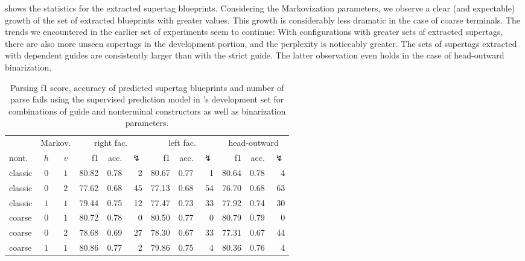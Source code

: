 \documentclass[../../document.tex]{subfiles}
\begin{document}
     shows the statistics for the extracted supertag blueprints.
    Considering the Markovization parameters, we observe a clear (and expectable) growth of the set of extracted blueprints with greater values.
    This growth is considerably less dramatic in the case of coarse terminals.
    The trends we encountered in the earlier set of experiments seem to continue:
        With configurations with greater sets of extracted supertags, there are also more unseen supertags in the development portion, and the perplexity is noticeably greater.
        The sets of supertags extracted with dependent guides are consistently larger than with the strict guide.
    The latter observation even holds in the case of head-outward binarization.


    \begin{table}
        \caption{\label{tbl:gridsearch:2:2}
        Parsing f1 score, accuracy of predicted supertag blueprints and number of parse fails using the supervised prediction model in \negra{}'s development set for combinations of guide and nonterminal constructors as well as binarization parameters.
        }
        \centering
        \vspace{.2cm}
        \begin{tabular}{lcc|rrr|rrr|rrr}
            \toprule
& \multicolumn{2}{c|}{Markov.}         & \multicolumn{3}{c|}{right fac.} & \multicolumn{3}{c|}{left fac.} & \multicolumn{3}{c}{head-outward} \\
nont.  & \(h\) &\(v\) & f1 & acc. & $\lightning$ & f1 & acc. & $\lightning$ & f1 & acc. & $\lightning$   \\ \hline
classic & \(0\) & \(1\) & 80.82 & 0.78 &  2 & 80.67 & 0.77 &  1 & 80.64 & 0.78 &  4 \\
classic & \(0\) & \(2\) & 77.62 & 0.68 & 45 & 77.13 & 0.68 & 54 & 76.70 & 0.68 & 63 \\
classic & \(1\) & \(1\) & 79.44 & 0.75 & 12 & 77.47 & 0.73 & 33 & 77.92 & 0.74 & 30 \\\hline
coarse  & \(0\) & \(1\) & 80.72 & 0.78 &  0 & 80.50 & 0.77 &  0 & 80.79 & 0.79 &  0 \\
coarse  & \(0\) & \(2\) & 78.68 & 0.69 & 27 & 78.30 & 0.67 & 33 & 77.31 & 0.67 & 44 \\
coarse  & \(1\) & \(1\) & 80.86 & 0.77 &  2 & 79.86 & 0.75 &  4 & 80.36 & 0.76 &  4 \\
\bottomrule
        \end{tabular}
    \end{table}
\end{document}
